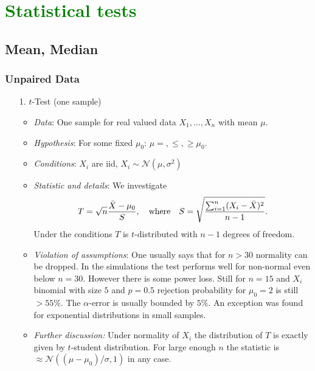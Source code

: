 \documentclass[12pt,a4paper]{amsart}
\theoremstyle{definition}
\theoremstyle{remark}
\numberwithin{equation}{section}
\begin{document}
\section{\textcolor{green}{Statistical tests}}

\subsection{Mean, Median}

\subsubsection{Unpaired Data}

\begin{itemize}
\item[1.] $t$-Test (one sample)
\begin{itemize}
\item \textit{Data}:  One sample for real valued data $X_1,...,X_n$ with mean $\mu$.
\item \textit{Hypothesis}: For some fixed $\mu_0$: $\mu =, \le, \ge \mu_0$. 
\item \textit{Conditions}: $X_i$ are iid, $X_i \sim \mathcal{N}(\mu, \sigma^2)$
\item \textit{Statistic and details}: We investigate
$$T= \sqrt{n}\frac{\bar{X}-\mu_0}{S}, \quad \textnormal{where} \quad S=\sqrt{\frac{\sum_{i=1}^n (X_i-\bar{X})^2}{n-1}}.$$
Under the conditions $T$ is $t$-distributed with $n-1$ degrees of freedom. 
\item \textit{Violation of assumptions}:
One usually says that for $n>30$ normality can be dropped. In the simulations the test performs well for non-normal even below $n=30$. However there is some power loss. Still for $n=15$ and $X_i$ binomial with size $5$ and $p=0.5$ rejection probability for $\mu_0=2$ is still $>55\%$.  The $\alpha$-error is usually bounded by $5\%$. An exception was found for exponential distributions in small samples.
\item \textit{Further discussion:} Under normality of $X_i$ the distribution of $T$ is exactly given by $t$-student distribution. For large enough $n$ the statistic is $\approx \mathcal{N}((\mu-\mu_0)/\sigma, 1)$ in any case. \\
\end{itemize}


\end{itemize}
\end{document}
